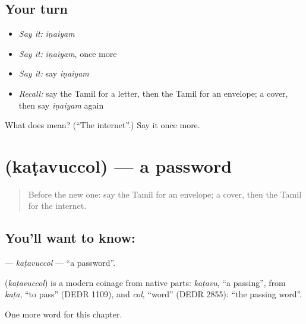 \subsection*{Your turn}
\begin{itemize}
\raggedright
  \item \emph{Say it:} \emph{iṇaiyam}
  \item \emph{Say it:} \emph{iṇaiyam}, once more
  \item \emph{Say it:} say \emph{iṇaiyam}
  \item \emph{Recall:} say the Tamil for a letter, then the Tamil for an envelope; a cover, then say \emph{iṇaiyam} again
\end{itemize}

\begin{tcolorbox}[breakable,colback=teal!4,colframe=teal!35!black,title={Before you move on}]
What does  mean? (\textquotedblleft{}The internet\textquotedblright{}.) Say it once more.
\end{tcolorbox}
\section[\texorpdfstring{\ta{கடவுச்சொல்} (kaṭavuccol)}{கடவுச்சொல் (kaṭavuccol)}]{ (kaṭavuccol) — a password}

\label{lesson:TA-C216-katavuccol}



\begin{quote}
Before the new one: say the Tamil for an envelope; a cover, then the Tamil for the internet.
\end{quote}

\subsection*{You'll want to know: }
\textbf{} — \emph{kaṭavuccol} — \textquotedblleft{}a password\textquotedblright{}.

\begin{cousinweb}
\textbf{} (\emph{kaṭavuccol}) is a modern coinage from native parts: \emph{kaṭavu}, \textquotedblleft{}a passing\textquotedblright{}, from \emph{kaṭa}, \textquotedblleft{}to pass\textquotedblright{} (DEDR 1109), and \emph{col}, \textquotedblleft{}word\textquotedblright{} (DEDR 2855): \textquotedblleft{}the passing word\textquotedblright{}.
\end{cousinweb}

\begin{grammarlens}[title={What you've built}]
One more word for this chapter.
\end{grammarlens}

